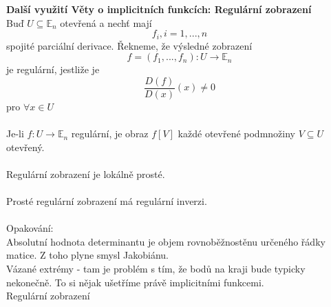 \documentclass{article}
\begin{document}
\textbf{Další využití Věty o implicitních funkcích: Regulární zobrazení}\\
Buď $U \subseteq \mathbb{E}_{n}$ otevřená a nechť mají
$$ f_{i}, i = 1, ..., n$$
spojité parciální derivace. Řekneme, že výsledné zobrazení
$$ f = (f_{1},...,f_{n}) : U \rightarrow \mathbb{E}_{n}$$
je regulární, jestliže je
$$\frac{D(f)}{D(x)}(x) \neq 0$$
pro $\forall x \in U$\\\\
Je-li $f: U \rightarrow \mathbb{E}_{n}$ regulární, je obraz $f[V]$ každé otevřené podmnožiny
$V \subseteq U$ otevřený.\\\\
Regulární zobrazení je lokálně prosté.\\\\
Prosté regulární zobrazení má regulární inverzi.\\\\

Opakování:\\
Absolutní hodnota determinantu je objem rovnoběžnostěnu určeného řádky matice. Z toho plyne smysl Jakobiánu.\\
Vázané extrémy - tam je problém s tím, že bodů na kraji bude typicky nekonečně. To si nějak ušetříme právě implicitními funkcemi.\\
Regulární zobrazení
\end{document}
